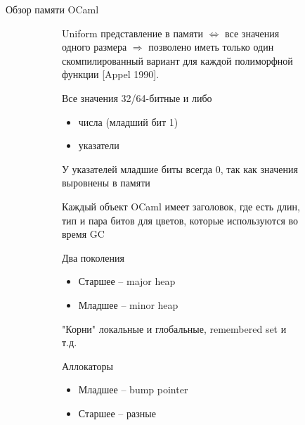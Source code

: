 \documentclass[aspectratio=169
  , xcolor={svgnames} 
  , hyperref={ colorlinks,citecolor=DeepPink4
             , linkcolor=DarkRed,urlcolor=DarkBlue}
  , russian
  ]{beamer}
\theoremstyle{exerciseStyle1}
\begin{document}
\begin{frame}[fragile]{Обзор памяти OCaml}

\begin{figure}[ht]
\begin{subfigure}{.49\textwidth}
Uniform представление в памяти $\Leftrightarrow$ все значения одного размера $\Rightarrow$ позволено иметь только один скомпилированный вариант для каждой полиморфной функции [Appel 1990].
\vspace{1cm}


Все значения 32/64-битные и либо
\begin{itemize}
\item числа (младший бит 1)
\item указатели
\end{itemize}

У указателей младшие биты всегда 0, так как значения выровнены в памяти
\end{subfigure}
\hspace{.5cm}
\begin{subfigure}{.39\textwidth}

Каждый объект OCaml имеет заголовок, где есть длин, тип и пара битов для цветов, которые используются во время GC \vspace{1cm}

Два поколения
\begin{itemize}
\item Старшее -- major heap
\item Младшее -- minor heap
\end{itemize}

"Корни" локальные и глобальные, remembered set и т.д.

Аллокаторы
\begin{itemize}
\item Младшее -- bump pointer
\item Старшее -- разные
\end{itemize}
\end{subfigure}
\end{figure}
\end{frame}
\end{document}
